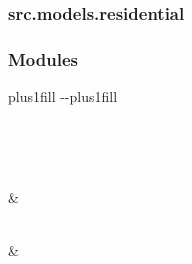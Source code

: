 \documentclass[letterpaper,10pt,english]{sphinxmanual}
\begin{document}
\sphinxstepscope


\subsubsection{src.models.residential}
\label{\detokenize{src.models.residential:module-src.models.residential}}\label{\detokenize{src.models.residential:src-models-residential}}\label{\detokenize{src.models.residential::doc}}\subsubsection*{Modules}


\begin{savenotes}
\sphinxatlongtablestart
\sphinxthistablewithglobalstyle
\sphinxthistablewithnovlinesstyle
\makeatletter
  \LTleft \@totalleftmargin plus1fill
  \LTright\dimexpr\columnwidth-\@totalleftmargin-\linewidth\relax plus1fill
\makeatother
\begin{longtable}{}
\sphinxtoprule
\endfirsthead

\\
\sphinxtoprule
\endhead

\sphinxbottomrule
{}\\
\endfoot

\endlastfoot
\sphinxtableatstartofbodyhook

\sphinxAtStartPar
{\hyperref[\detokenize{src.models.residential.preprocessor:module-src.models.residential.preprocessor}]{}}
&
\sphinxAtStartPar

\\
\sphinxhline
\sphinxAtStartPar
{\hyperref[\detokenize{src.models.residential.scripts:module-src.models.residential.scripts}]{}}
&
\sphinxAtStartPar

\\
\sphinxbottomrule
\end{longtable}
\sphinxtableafterendhook
\sphinxatlongtableend
\end{savenotes}
\end{document}
